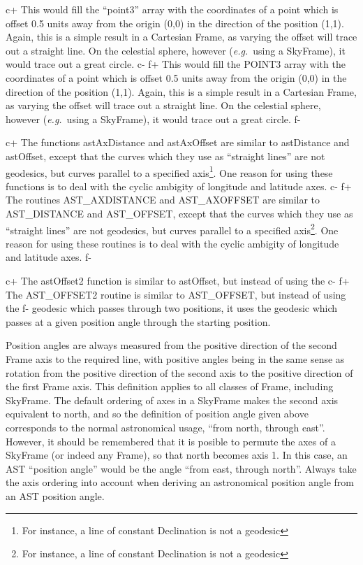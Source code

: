 \documentclass[twoside,11pt]{article}
\begin{document}
c+
This would fill the ``point3'' array with the coordinates of a point
which is offset 0.5 units away from the origin (0,0) in the direction
of the position (1,1). Again, this is a simple result in a Cartesian
Frame, as varying the offset will trace out a straight line. On the
celestial sphere, however ({\em{e.g.}}\ using a SkyFrame), it would
trace out a great circle.
c-
f+
This would fill the POINT3 array with the coordinates of a point which
is offset 0.5 units away from the origin (0,0) in the direction of the
position (1,1). Again, this is a simple result in a Cartesian Frame,
as varying the offset will trace out a straight line. On the celestial
sphere, however ({\em{e.g.}}\ using a SkyFrame), it would trace out a
great circle.
f-

c+
The functions astAxDistance and astAxOffset are similar to astDistance
and astOffset, except that the curves which they use as ``straight
lines'' are not geodesics, but curves parallel to a specified axis\footnote
{For instance, a line of constant Declination is not a geodesic}. One
reason for using these functions is to deal with the cyclic ambigity of
longitude and latitude axes.
c-
f+
The routines AST\_AXDISTANCE and AST\_AXOFFSET are similar to AST\_DISTANCE
and AST\_OFFSET, except that the curves which they use as ``straight
lines'' are not geodesics, but curves parallel to a specified axis\footnote
{For instance, a line of constant Declination is not a geodesic}. One
reason for using these routines is to deal with the cyclic ambigity of
longitude and latitude axes.
f-

c+
The astOffset2 function is similar to astOffset, but instead of using the
c-
f+
The AST\_OFFSET2 routine is similar to AST\_OFFSET, but instead of using the
f-
geodesic which passes through two positions, it uses the geodesic which
passes at a given position angle through the starting position. 

Position angles are always measured from the positive direction of the 
second Frame axis to the required line, with positive angles being in the 
same sense as rotation from the positive direction of the second axis to 
the positive direction of the first Frame axis. This definition applies
to all classes of Frame, including SkyFrame. The default ordering of axes
in a SkyFrame makes the second axis equivalent to north, and so the
definition of position angle given above corresponds to the normal 
astronomical usage, ``from north, through east''. However, it should be
remembered that it is posible to permute the axes of a SkyFrame (or
indeed any Frame), so that north becomes axis 1. In this case, an AST
``position angle'' would be the angle ``from east, through north''. 
Always take the axis ordering into account when deriving an astronomical 
position angle from an AST position angle.
\end{document}

